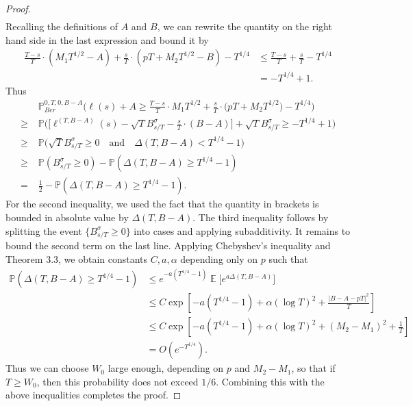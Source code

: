 \documentclass[12pt]{article}
\DeclareMathOperator{\ex}{\mathbb{E}}
\begin{document}
\begin{proof}
\begin{align*}
		\end{align*}
		Recalling the definitions of $A$ and $B$, we can rewrite the quantity on the right hand side in the last expression and bound it by
		\begin{align*}
		\frac{T-s}{T}\cdot(M_1T^{1/2}-A) + \frac{s}{T}\cdot(pT + M_2T^{1/2} - B) - T^{1/4} &\leq  \frac{T-s}{T} + \frac{s}{T} - T^{1/4}\\
		& = -T^{1/4} + 1.
		\end{align*}
		Thus
		\begin{align*}
		&\mathbb{P}^{0,T,0,B-A}_{Ber}\Big( \ell(s) + A  \geq \frac{T-s}{T} \cdot M_1 T^{1/2} + \frac{s}{T} \cdot \big(p T + M_2 T^{1/2}\big) - T^{1/4} \Big)\\
		\geq \; & \mathbb{P}\Big( \Big[\ell^{(T,B-A)}(s) - \sqrt{T} B^\sigma_{s/T} - \frac{s}{T}\cdot(B-A)\Big] + \sqrt{T}B^\sigma_{s/T} \geq -T^{1/4} + 1 \Big)\\
		\geq \; & \mathbb{P}\Big( \sqrt{T}B^\sigma_{s/T} \geq 0 \quad \mathrm{and} \quad \Delta(T,B-A) < T^{1/4} - 1 \Big)\\
		\geq \; & \mathbb{P}\left( B^\sigma_{s/T} \geq 0 \right) - \mathbb{P}\left( \Delta(T,B-A) \geq T^{1/4} - 1 \right)\\
		= \; & \frac{1}{2} - \mathbb{P}\left( \Delta(T,B-A) \geq T^{1/4} - 1 \right).
		\end{align*}
		For the second inequality, we used the fact that the quantity in brackets is bounded in absolute value by $\Delta(T,B-A)$. The third inequality follows by splitting the event $\{B^\sigma_{s/T}\geq 0\}$ into cases and applying subadditivity. It remains to bound the second term on the last line. Applying Chebyshev's inequality and Theorem 3.3, we obtain constants $C,a,\alpha$ depending only on $p$ such that
		\begin{align*}
		\mathbb{P}\left( \Delta(T,B-A) \geq T^{1/4} - 1 \right) & \leq e^{-a(T^{1/4} - 1)} \ex\Big[ e^{a\Delta(T,B-A)} \Big]\\
		&\leq C \exp\left[ -a(T^{1/4}-1) + \alpha(\log T)^2 + \frac{|B-A-pT|^2}{T} \right]\\
		&\leq C \exp\left[ -a(T^{1/4}-1) + \alpha(\log T)^2 + (M_2-M_1)^2 + \frac{1}{T} \right]\\
		&= O(e^{-T^{1/4}}).
		\end{align*}
		Thus we can choose $W_0$ large enough, depending on $p$ and $M_2-M_1$, so that if $T \geq W_0$, then this probability does not exceed $1/6$. Combining this with the above inequalities completes the proof.
		
	\end{proof}
\end{document}
